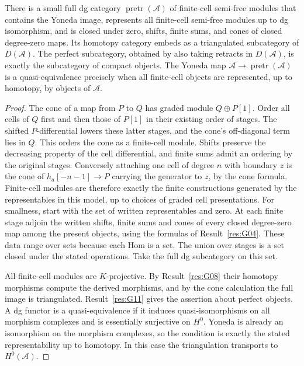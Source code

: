 \begin{proposition}\label{res:G12}
There is a small full dg category \(\operatorname{pretr}(\mathcal A)\)
of finite-cell semi-free modules that contains the Yoneda image,
represents all finite-cell semi-free modules up to dg isomorphism,
and is closed under zero, shifts, finite sums, and cones of closed
degree-zero maps. Its homotopy category embeds as a triangulated
subcategory of \(D(\mathcal A)\). The perfect subcategory,
obtained by also taking retracts in \(D(\mathcal A)\), is exactly
the subcategory of compact objects. The Yoneda map
\(\mathcal A\to\operatorname{pretr}(\mathcal A)\) is a quasi-equivalence
precisely when all finite-cell objects are represented, up to
homotopy, by objects of \(\mathcal A\).
\end{proposition}
\begin{proof}
The cone of a map from \(P\) to \(Q\) has graded module
\(Q\oplus P[1]\). Order all cells of \(Q\) first and then those
of \(P[1]\) in their existing order of stages. The shifted
\(P\)-differential lowers these latter stages, and the cone's
off-diagonal term lies in \(Q\). This orders the cone as a
finite-cell module. Shifts preserve the decreasing property of
the cell differential, and finite sums admit an ordering by
the original stages. Conversely attaching one cell of degree
\(n\) with boundary \(z\) is the cone of
\(h_a[-n-1]\to P\) carrying the generator to \(z\), by the cone
formula. Finite-cell modules are therefore exactly the finite
constructions generated by the representables in this model,
up to choices of graded cell presentations. For smallness,
start with the set of written representables and zero. At
each finite stage adjoin the written shifts, finite sums and
cones of every closed degree-zero map among the present objects,
using the formulas of Result~\ref{res:G04}. These data range
over sets because each Hom is a set. The union over stages
is a set closed under the stated operations. Take the full
dg subcategory on this set.

All finite-cell modules are \(K\)-projective. By
Result~\ref{res:G08} their homotopy morphisms compute the
derived morphisms, and by the cone calculation the full image
is triangulated. Result~\ref{res:G11} gives the assertion about
perfect objects. A dg functor is a quasi-equivalence if it
induces quasi-isomorphisms on all morphism complexes and is
essentially surjective on \(H^0\). Yoneda is already an
isomorphism on the morphism complexes, so the condition is
exactly the stated representability up to homotopy. In this
case the triangulation transports to \(H^0(\mathcal A)\).
\end{proof}

